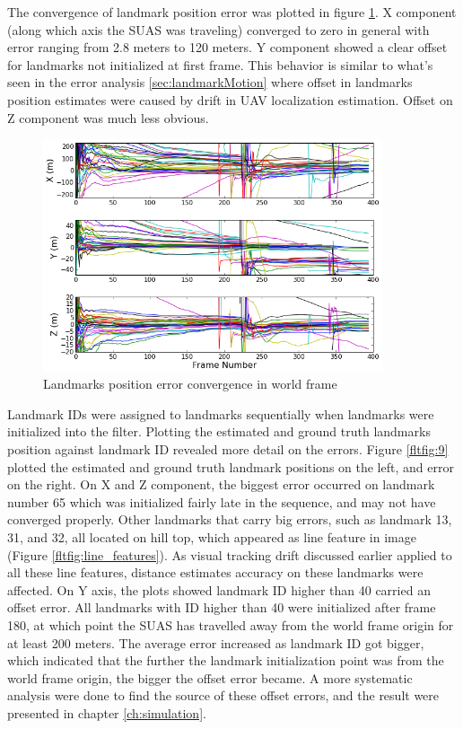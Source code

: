 The convergence of landmark position error was plotted in figure
\ref{fltfig:8}. X component (along which axis the SUAS was traveling)
converged to zero in general with error ranging from 2.8 meters to 120
meters. Y component showed a clear offset for landmarks not initialized
at first frame. This behavior is similar to what's seen in the
error analysis \ref{sec:landmarkMotion} where offset in landmarks
position estimates were caused by drift in UAV localization
estimation. Offset on Z component was much less obvious.

\begin{figure}[h]
\centering
\includegraphics[width=10cm, keepaspectratio=true]
{./Figures/fltfig/cut1/Figure50.png}
\caption{Landmarks position error convergence in world frame}
\label{fltfig:8}
\end{figure}

Landmark IDs were assigned to landmarks sequentially when landmarks
were initialized into the filter. Plotting the estimated and ground
truth landmarks position against landmark ID revealed more detail on
the errors. Figure \ref{fltfig:9} plotted the estimated and ground
truth landmark positions on the left, and error on the right. On X and
Z component, the biggest error occurred on landmark number 65 which
was initialized fairly late in the sequence, and may not have
converged properly. Other landmarks that carry big errors, such as
landmark 13, 31, and 32, all located on hill top, which appeared as
line feature in image (Figure \ref{fltfig:line_features}). As visual
tracking drift discussed earlier applied to all these line features,
distance estimates accuracy on these landmarks were affected. On Y
axis, the plots showed landmark ID higher than 40 carried an offset
error. All landmarks with ID higher than 40 were initialized after
frame 180, at which point the SUAS has travelled away from the world
frame origin for at least 200 meters. The average error increased as
landmark ID got bigger, which indicated that the further the landmark
initialization point was from the world frame origin, the bigger the
offset error became. A more systematic analysis were done to find the
source of these offset errors, and the result were presented in
chapter \ref{ch:simulation}.

